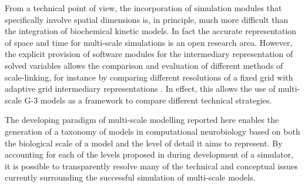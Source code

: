 \documentclass[11pt,3p,twocolumn]{JMN}
\begin{document}
From a technical point of view, the incorporation of simulation modules that specifically involve spatial dimensions is, in principle, much more difficult than the integration of biochemical kinetic models. In fact the accurate representation of space and time for multi-scale simulations is an open research area.  However, the explicit provision of software modules for the intermediary representation of solved variables allows the comparison and evaluation of different methods of scale-linking, for instance by comparing different resolutions of a fixed grid with adaptive grid intermediary
representations \cite{MO:2009bh}. In effect, this allows the use of multi-scale G-3 models as a framework to compare different technical strategies.

The developing paradigm of multi-scale modelling reported here enables the generation of a taxonomy of models in computational neurobiology
based on both the biological scale of a model and the level of detail it aims to represent. By accounting for each of the levels proposed in \cite{Marr:19821kx} during development of a simulator, it is possible to transparently resolve many of the technical and conceptual issues currently surrounding the successful simulation of multi-scale models.

%
 
\end{document}

